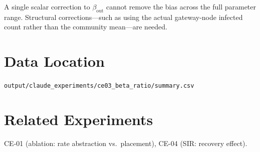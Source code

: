 \documentclass[11pt,a4paper]{article}
\begin{document}
A single scalar correction to $\beta_{\text{out}}$ cannot remove the bias
across the full parameter range.  Structural corrections---such as using the
actual gateway-node infected count rather than the community mean---are needed.

\section*{Data Location}
\texttt{output/claude\_experiments/ce03\_beta\_ratio/summary.csv}

\section*{Related Experiments}
CE-01 (ablation: rate abstraction vs.\ placement), CE-04 (SIR: recovery effect).
\end{document}
